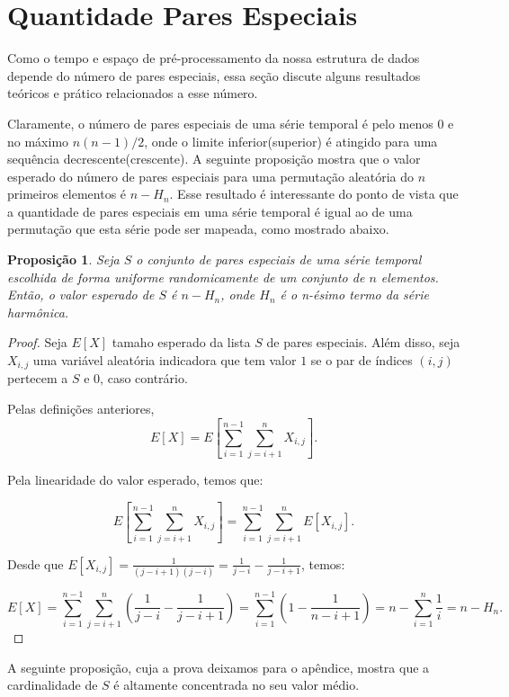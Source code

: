 \documentclass[12pt]{article}
\newtheorem{prop}[thm]{Proposição}
\begin{document}
\section{Quantidade Pares Especiais}

Como o tempo e espaço de pré-processamento da nossa estrutura de dados
depende do número de pares especiais, essa seção discute alguns resultados
teóricos e prático relacionados a esse número.

Claramente, o número de pares especiais de uma série temporal é pelo 
menos 0 e no máximo $n(n - 1)/2$, onde o limite inferior(superior) é
atingido para uma sequência decrescente(crescente). A seguinte proposição
mostra que o valor esperado do número de pares especiais para uma permutação
aleatória do $n$ primeiros elementos é $n - H_n$. Esse resultado é interessante
do ponto de vista que a quantidade de pares especiais em uma série temporal 
é igual ao de uma permutação que esta série pode ser mapeada, como mostrado abaixo.

\begin{prop}
Seja $S$ o conjunto de pares especiais de uma série 
temporal escolhida de forma uniforme randomicamente de um conjunto de $n$ elementos.
Então, o valor esperado de $S$ é $n - H_n$, onde $H_n$ é o n-ésimo termo 
da série harmônica.
\end{prop}
\begin{proof}
Seja $E[X]$ tamaho esperado da lista $S$ de pares especiais.
Além disso, seja $X_{i,j}$ uma variável aleatória indicadora que
tem valor $1$ se o par de índices $(i,j)$ pertecem a $S$ e $0$, caso contrário.

Pelas definições anteriores, 
$$E[X] = E[\sum\limits_{i=1}^{n-1} \sum\limits_{j=i+1}^{n}X_{i,j}].$$

Pela linearidade do valor esperado, temos que:

$$E[\sum\limits_{i=1}^{n-1} \sum\limits_{j=i+1}^{n}X_{i,j}] = \sum\limits_{i=1}^{n-1} \sum\limits_{j=i+1}^{n} E[X_{i,j}].$$

Desde que $E[X_{i,j}] = \frac{1}{(j-i+1)(j-i)} = \frac{1}{j-i} - \frac{1}{j-i+1}$, temos:

$$E[X] = \sum\limits_{i=1}^{n-1} \sum\limits_{j=i+1}^{n}
\left (\frac{1}{j-i} - \frac{1}{j-i+1} \right )
= \sum\limits_{i=1}^{n-1} \left (1 - \frac{1}{n-i+1} \right)
= n - \sum\limits_{i=1}^{n} \frac{1}{i}  =  n - H_n.$$
\end{proof}

A seguinte proposição, cuja a prova deixamos para o apêndice, mostra que 
a cardinalidade de $S$ é altamente concentrada no seu valor médio.
\end{document}
